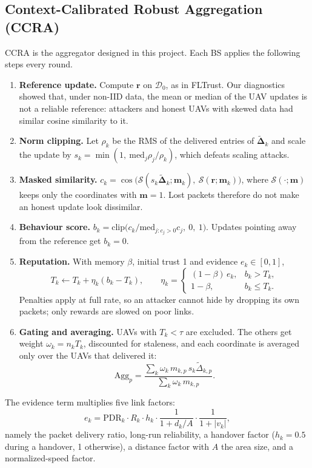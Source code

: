 \subsection{Context-Calibrated Robust Aggregation (CCRA)}
CCRA is the aggregator designed in this project. Each BS applies the following
steps every round.
\begin{enumerate}
\item \textbf{Reference update.} Compute $\mathbf{r}$ on $\mathcal{D}_0$, as in FLTrust.
  Our diagnostics showed that, under non-IID data, the mean or median of the UAV
  updates is not a reliable reference: attackers and honest UAVs with skewed data
  had similar cosine similarity to it.
\item \textbf{Norm clipping.} Let $\rho_k$ be the RMS of the delivered entries of
  $\tilde{\boldsymbol\Delta}_k$ and scale the update by
  $s_k=\min(1,\ \mathrm{med}_j\rho_j/\rho_k)$, which defeats scaling attacks.
\item \textbf{Masked similarity.}
  $c_k=\cos\bigl(\mathcal{S}(s_k\tilde{\boldsymbol\Delta}_k;\mathbf{m}_k),\
  \mathcal{S}(\mathbf{r};\mathbf{m}_k)\bigr)$, where $\mathcal{S}(\cdot;\mathbf{m})$
  keeps only the coordinates with $\mathbf{m}=1$. Lost packets therefore do not make
  an honest update look dissimilar.
\item \textbf{Behaviour score.} $b_k=\mathrm{clip}\bigl(c_k/\mathrm{med}_{j:c_j>0}c_j,\
  0,\ 1\bigr)$. Updates pointing away from the reference get $b_k=0$.
\item \textbf{Reputation.} With memory $\beta$, initial trust 1 and evidence
  $e_k\in[0,1]$,
  \begin{equation}
    T_k \leftarrow T_k+\eta_k(b_k-T_k),\qquad
    \eta_k=\begin{cases}(1-\beta)\,e_k, & b_k>T_k,\\ 1-\beta, & b_k\le T_k.\end{cases}
    \label{eq:reputation}
  \end{equation}
  Penalties apply at full rate, so an attacker cannot hide by dropping its own
  packets; only rewards are slowed on poor links.
\item \textbf{Gating and averaging.} UAVs with $T_k<\tau$ are excluded. The others get
  weight $\omega_k=n_kT_k$, discounted for staleness, and each coordinate is averaged
  only over the UAVs that delivered it:
  \begin{equation}
    \mathrm{Agg}_p=\frac{\sum_k\omega_k\,m_{k,p}\,s_k\tilde\Delta_{k,p}}
                      {\sum_k\omega_k\,m_{k,p}}.
    \label{eq:masked-average}
  \end{equation}
\end{enumerate}
The evidence term multiplies five link factors:
\begin{equation}
  e_k=\mathrm{PDR}_k\cdot R_k\cdot h_k\cdot\frac{1}{1+d_k/A}\cdot\frac{1}{1+|v_k|},
\end{equation}
namely the packet delivery ratio, long-run reliability, a handover factor
($h_k=0.5$ during a handover, 1 otherwise), a distance factor with $A$ the area size,
and a normalized-speed factor.

